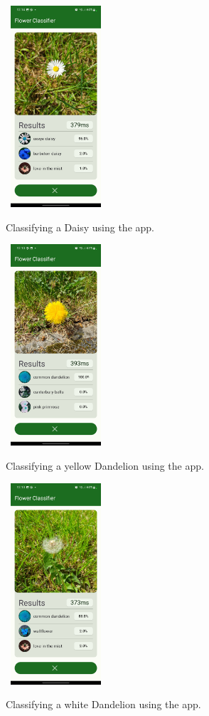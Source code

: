 \documentclass[12pt,a4paper]{report}
\begin{document}
\begin{figure}[h]\
    \includegraphics[width=0.3\textwidth]{daisy.jpg}
    \caption{Classifying a Daisy using the app.}
    \label{fig:daisy}
\end{figure}

\begin{figure}[h]\
    \includegraphics[width=0.3\textwidth]{dandelion.jpg}
    \caption{Classifying a yellow Dandelion using the app.}
    \label{fig:dandelion}
\end{figure}

\begin{figure}[h]\
    \includegraphics[width=0.3\textwidth]{dandelion_2.jpg}
    \caption{Classifying a white Dandelion using the app.}
    \label{fig:dandelion_2}
\end{figure}
\end{document}
